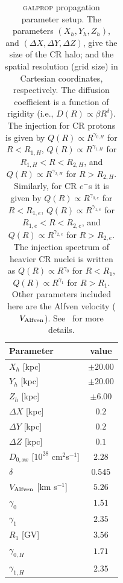 \documentclass[doublespace,nopageskip]{VTthesis} %
\begin{document}
\begin{table}[htb!]
\centering
\caption{\textsc{galprop} propagation parameter setup. The parameters $(X_h, Y_h, Z_h)$, and $(\Delta X, \Delta Y, \Delta Z)$, give the size of the CR halo; and the spatial resolution (grid size) in Cartesian coordinates, respectively. The diffusion coefficient is a function of rigidity (i.e., $D(R) \propto \beta R^{\delta}$). The injection for CR protons is given by $Q(R) \propto R^{\gamma_{0,H}}$ for $R < R_{1,H}$, $Q(R) \propto R^{\gamma_{1,H}}$ for $R_{1,H} < R < R_{2,H}$, and $Q(R) \propto R^{\gamma_{2,H}}$ for $R > R_{2,H}$. Similarly, for CR $e^-$s it is given by $Q(R) \propto R^{\gamma_{0,e}}$ for $R < R_{1,e}$, $Q(R) \propto R^{\gamma_{1,e}}$ for $R_{1,e} < R < R_{2,e}$, and $Q(R) \propto R^{\gamma_{2,e}}$ for $R > R_{2,e}$. The injection spectrum of heavier  CR nuclei is written as $Q(R) \propto R^{\gamma_0}$ for $R < R_1$, $Q(R) \propto R^{\gamma_1}$ for $ R > R_1$. Other parameters included here are the Alfven velocity ($V_{\rm Alfven}$). See~\citet{2018ApJ...856...45J} for more details.}
\begin{tabular}{lc}
\toprule
Parameter                                              & value\\\hline
$X_h$ [kpc]                                            & $\pm 20.00$\\
$Y_h$ [kpc]                                            & $\pm 20.00$\\
$Z_h$ [kpc]                                            & $\pm 6.00$\\
$\Delta X$ [kpc]                                       & $0.2$\\
$\Delta Y$ [kpc]                                       & $0.2$\\
$\Delta Z$ [kpc]                                       & $0.1$\\
$D_{0,xx}$ [$10^{28}$ cm$^2$s$^{-1}$]                  & $2.28$\\
$\delta$                              & $0.545$\\
$V_{\rm Alfven}$ [km s$^{-1}$]                         & $5.26$ \\
$\gamma_0$                            & $1.51$ \\
$\gamma_1$                            & $2.35$\\
$R_1$ [GV]                            & $3.56$\\
$\gamma_{0,H}$                        & $1.71$\\
$\gamma_{1,H}$                        & $2.35$\\

\end{tabular}
\end{table}
\end{document}

